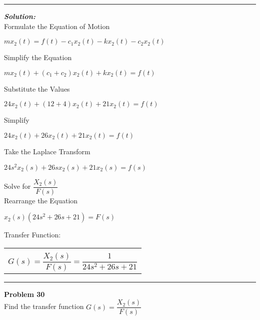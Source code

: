 \documentclass[11pt,letterpaper]{article}
\begin{document}
	\rule{\textwidth}{1pt}
\vspace{12pt}
\textit{\textbf{Solution:}}\\
Formulate the Equation of Motion\\
\begin{center}
	$mx_2(t)=f(t)-c_1x_2(t)-kx_2(t)-c_2x_2(t)$\\
\end{center}
Simplify the Equation\\
\begin{center}
	$mx_2(t)+(c_1+c_2)x_2(t)+kx_2(t)=f(t)$\\
\end{center}
Substitute the Values\\
\begin{center}
	$24x_2(t)+(12+4)x_2(t)+21x_2(t)=f(t)$\\
\end{center}
Simplify\\
\begin{center}
	$24x_2(t)+26x_2(t)+21x_2(t)=f(t)$\\
\end{center}
Take the Laplace Transform\\
\begin{center}
	$24s^2x_2(s)+26sx_2(s)+21x_2(s)=f(s)$\\
\end{center}
Solve for $\dfrac{X_2(s)}{F(s)}$\\[12pt]
Rearrange the Equation\\
\begin{center}
	$x_2(s)(24s^2+26s+21)=F(s)$\\
\end{center}
Transfer Function:\\
\begin{center}
	\begin{tabular}{|c|}
		\hline \\
		$G(s)=\dfrac{X_2(s)}{F(s)}=\dfrac{1}{24s^2+26s+21}$	\\ [12pt]
	\hline
	\end{tabular}	
\end{center}

\clearpage

\rule{\textwidth}{1pt}
\textbf{Problem 30}\\
Find the transfer function $G(s)=\dfrac{X_2(s)}{F(s)}$\\
\end{document}
